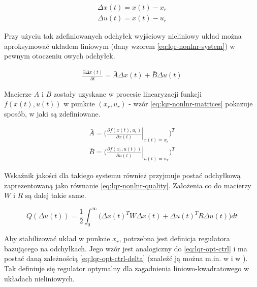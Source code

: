 \begin{equation}\label{eq:lqr-deltas}
\begin{array}{lr}
    \Delta x(t) = x(t) - x_{r}\\
    \Delta u(t) = x(t) - u_{r}
\end{array}
\end{equation}

Przy użyciu tak zdefiniowanych odchyłek wyjściowy nieliniowy układ można aproksymować układem liniowym (dany wzorem \ref{eq:lqr-nonlnr-system}) w pewnym otoczeniu owych odchyłek.

\begin{equation}\label{eq:lqr-nonlnr-system}
\begin{array}{lr}
    \frac{\partial \Delta x(t)}{\partial t} = \bar{A}\Delta x(t) + \bar{B}\Delta u(t)
\end{array}
\end{equation}

Macierze $A$ i $B$ zostały uzyskane w procesie linearyzacji funkcji $f(x(t), u(t))$ w punkcie $(x_{r}, u_{r})$ - wzór \ref{eq:lqr-nonlnr-matrices} pokazuje sposób, w jaki są zdefiniowane.

\begin{equation}\label{eq:lqr-nonlnr-matrices}
\begin{array}{lr}
    \bar{A} = \bigg(\left. \frac{\partial f(x(t), u_{r})}{\partial x(t)}\right\vert_{x(t) = x_{r}}\bigg)^{T}\\
    \bar{B} = \bigg(\left. \frac{\partial f(x_{r}, u(t))}{\partial u(t)}\right\vert_{u(t) = u_{r}}\bigg)^{T}
\end{array}
\end{equation}

Wskaźnik jakości dla takiego systemu również przyjmuje postać odchyłkową zaprezentowaną jako równanie \ref{eq:lqr-nonlnr-quality}. Założenia co do macierzy $W$ i $R$ są dalej takie same.

\begin{equation}\label{eq:lqr-nonlnr-quality}
Q(\Delta u(t)) = \frac{1}{2}\int_{0}^{\infty} \Big( \Delta x(t)^{T}W\Delta x(t) + \Delta u(t)^{T}R\Delta u(t) \Big)dt
\end{equation}

Aby stabilizować układ w punkcie $x_{r}$, potrzebna jest definicja regulatora bazującego na odchyłkach.
Jego wzór jest analogiczny do \ref{eq:lqr-opt-ctrl} i ma postać daną zależnością \ref{eq:lqr-opt-ctrl-delta} (znaleźć ją można m.in. w \cite{Mitk2007} i w \cite{Korytowski2015}). Tak definiuje się regulator optymalny dla zagadnienia liniowo-kwadratowego w układach nieliniowych.


